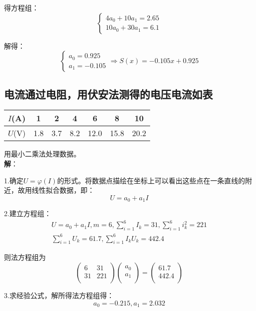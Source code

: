 \documentclass[UTF8,a4paper,11pt,oneside]{ctexbook}
\begin{document}
得方程组：
\[
\begin{cases}
    4a_0+10a_1=2.65\\
    10a_0+30a_1=6.1
\end{cases}
\]

解得：
\[
\begin{cases}
    a_0=0.925\\
    a_1=-0.105
\end{cases}
\Rightarrow S(x)=-0.105x+0.925
\]

\subsection*{电流通过电阻，用伏安法测得的电压电流如表}
\begin{center}
    \begin{tabular}{|c|c|c|c|c|c|c|}
        \hline
        \(I\)(A) & 1 & 2 & 4 & 6 & 8 & 10 \\
        \hline
        \(U\)(V) & 1.8 & 3.7 & 8.2 & 12.0 & 15.8 & 20.2 \\
        \hline
    \end{tabular}
\end{center}

用最小二乘法处理数据。\\
\textbf{解}：

1.确定\(U=\varphi(I)\)的形式。将数据点描绘在坐标上可以看出这些点在一条直线的附近，故用线性拟合数据，即：
\[
U=a_0+a_1I
\]

2.建立方程组：
\begin{gather*}
    U=a_0+a_1I,m=6,\sum_{i=1}^6I_k=31,\sum_{i=1}^6i_k^2=221\\
    \sum_{i=1}^6U_k=61.7,\sum_{i=1}^6I_kU_k=442.4
\end{gather*}

则法方程组为
\[
\begin{pmatrix}
    6 & 31\\
    31 & 221\\
\end{pmatrix}
\begin{pmatrix}
    a_0\\
    a_1\\
\end{pmatrix}
=
\begin{pmatrix}
    61.7\\
    442.4\\
\end{pmatrix}
\]

3.求经验公式，解所得法方程组得：
\[
a_0=-0.215,a_1=2.032
\]
\end{document}
